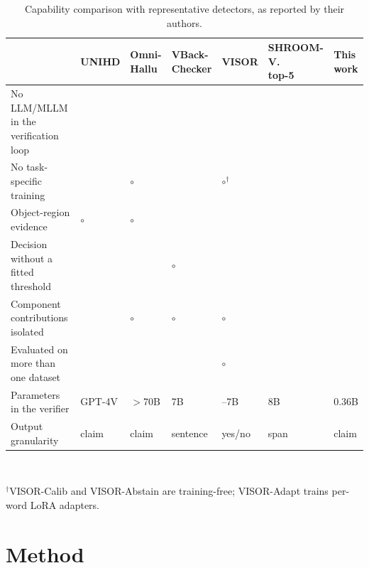 \documentclass[11pt]{article}
\newcommand{\cmark}{\ding{51}}
\newcommand{\xmark}{\ding{55}}
\newcommand{\pmark}{$\circ$}
\begin{document}
\begin{table}[!htbp]
\centering
\caption{Capability comparison with representative detectors, as reported by their authors.}
\label{tab:capability}
\footnotesize
\setlength{\tabcolsep}{3pt}
\begin{tabularx}{\textwidth}{>{\raggedright\arraybackslash}p{2.9cm}*{6}{>{\centering\arraybackslash}X}}
\toprule
 & \makecell{UNIHD\\\cite{chen2024unihd}} & \makecell{Omni-\\Hallu\\\cite{yang2026omnihallu}} & \makecell{VBack-\\Checker\\\cite{guo2026vbackchecker}} & \makecell{VISOR\\\cite{zhang2026visor}} & \makecell{SHROOM-V.\\top-5\\\cite{vazquez2026shroomvisions}} & \makecell{\textbf{This}\\\textbf{work}} \\
\midrule
No LLM/MLLM in the verification loop & \xmark & \xmark & \xmark & \xmark & \xmark & \cmark \\
No task-specific training & \cmark & \pmark & \xmark & \pmark$^{\dagger}$ & \xmark & \cmark \\
Object-region evidence & \pmark & \pmark & \cmark & \xmark & \xmark & \cmark \\
Decision without a fitted threshold & \xmark & \xmark & \pmark & \xmark & \xmark & \cmark \\
Component contributions isolated & \xmark & \pmark & \pmark & \pmark & \xmark & \cmark \\
Evaluated on more than one dataset & \cmark & \cmark & \cmark & \pmark & \xmark & \cmark \\
Parameters in the verifier & GPT-4V & $>$70B & 7B & 3--7B & 8B & 0.36B \\
Output granularity & claim & claim & sentence & yes/no & span & claim \\
\bottomrule
\end{tabularx}\\[3pt]
\parbox{\textwidth}{\footnotesize $^{\dagger}$VISOR-Calib and VISOR-Abstain are training-free; VISOR-Adapt trains per-word LoRA adapters.}
\end{table}

\section{Method}\label{sec:method}
\end{document}
